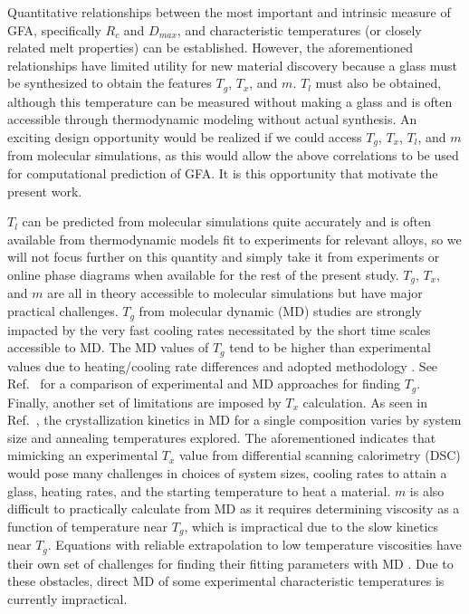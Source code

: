 \documentclass[11pt,a4paper]{article}                                %
\begin{document}
\par
Quantitative relationships between the most important and intrinsic measure of GFA, specifically $R_{c}$ and $D_{max}$, and characteristic temperatures (or closely related melt properties) can be established. However, the aforementioned relationships have limited utility for new material discovery because a glass must be synthesized to obtain the features $T_{g}$, $T_{x}$, and $m$. $T_{l}$ must also be obtained, although this temperature can be measured without making a glass and is often accessible through thermodynamic modeling without actual synthesis. An exciting design opportunity would be realized if we could access $T_{g}$, $T_{x}$, $T_{l}$, and $m$ from molecular simulations, as this would allow the above correlations to be used for computational prediction of GFA. It is this opportunity that motivate the present work.

\par
$T_l$ can be predicted from molecular simulations quite accurately \cite{Hafner1983, Hong2015, Jinnouchi2019} and is often available from thermodynamic models fit to experiments for relevant alloys, so we will not focus further on this quantity and simply take it from experiments or online phase diagrams when available for the rest of the present study. $T_{g}$, $T_x$, and $m$ are all in theory accessible to molecular simulations but have major practical challenges. $T_{g}$ from molecular dynamic (MD) studies are strongly impacted by the very fast cooling rates necessitated by the short time scales accessible to MD. The MD values of $T_{g}$ tend to be higher than experimental values due to heating/cooling rate differences and adopted methodology \cite{Aliaga2019, Musgraves2019}. See Ref.~\cite{Aliaga2019} for a comparison of experimental and MD approaches for finding $T_{g}$. Finally, another set of limitations are imposed by $T_x$ calculation. As seen in Ref.~\cite{Louzguine-Luzgin2020}, the crystallization kinetics in MD for a single composition varies by system size and annealing temperatures explored. The aforementioned indicates that mimicking an experimental $T_x$ value from differential scanning calorimetry (DSC) would pose many challenges in choices of system sizes, cooling rates to attain a glass, heating rates, and the starting temperature to heat a material. $m$ is also difficult to practically calculate from MD as it requires determining viscosity as a function of temperature near $T_{g}$, which is impractical due to the slow kinetics near $T_{g}$. Equations with reliable extrapolation to low temperature viscosities have their own set of challenges for finding their fitting parameters with MD \cite{Blodgett2015, Chen2020}. Due to these obstacles, direct MD of some experimental characteristic temperatures is currently impractical.
\end{document}
